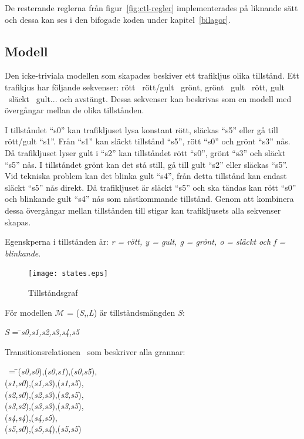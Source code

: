 De resterande reglerna från figur~\ref{fig:ctl-regler} implementerades på liknande sätt och dessa kan ses i den bifogade koden under kapitel~\ref{bilagor}.

\subsection{Modell}\label{sub:modell}

Den icke-triviala modellen som skapades beskiver ett trafikljus olika tillstånd. Ett trafikjus har följande sekvenser: rött \textrightarrow\ rött/gult \textrightarrow\ grönt, grönt \textrightarrow\ gult \textrightarrow\ rött, gult \textrightarrow\ släckt  \textrightarrow\ gult... och avstängt. Dessa sekvenser kan beskrivas som en modell med övergångar mellan de olika tillstånden.

I tillståndet “s0” kan trafikljuset lysa konstant rött, släckas “s5” eller gå till rött/gult “s1”. Från “s1” kan släckt tillstånd “s5”, rött “s0” och grönt “s3” nås. Då trafikljuset lyser gult i “s2” kan tillståndet rött “s0”, grönt “s3” och släckt “s5” nås. I tillståndet grönt kan det stå still, gå till gult “s2” eller släckas “s5”. Vid tekniska problem kan det blinka gult “s4”, från detta tillstånd kan endast släckt “s5” nås direkt. Då trafikljuset är släckt “s5” och ska tändas kan rött “s0” och blinkande gult “s4” nås som nästkommande tillstånd. Genom att kombinera dessa övergångar mellan tillstånden till stigar kan trafikljusets alla sekvenser skapas.

Egenskperna i tillstånden är: \textit{r = rött, y = gult, g = grönt, o = släckt och f = blinkande}.

\begin{figure}[hb]
\texttt{[image: states.eps]}
\caption{Tillståndsgraf}
\label{fig:ctl-states}
\end{figure}

För modellen $\mathcal{M}$ = (\textit{S},\textrightarrow,\textit{L}) är tillståndsmängden \textit{S}:

\begin{tabbing}
\textit{S} = \= \textbraceleft \textit{s0,s1,s2,s3,s4,s5}\textbraceright\\
\end{tabbing}

Transitionsrelationen \textrightarrow\ som beskriver alla grannar: 
\begin{tabbing}
\textrightarrow\ = \= \textbraceleft (\textit{s0,s0}),(\textit{s0,s1}),(\textit{s0,s5}),\\
\> (\textit{s1,s0}),(\textit{s1,s3}),(\textit{s1,s5}),\\
\> (\textit{s2,s0}),(\textit{s2,s3}),(\textit{s2,s5}),\\
\> (\textit{s3,s2}),(\textit{s3,s3}),(\textit{s3,s5}),\\
\> (\textit{s4,s4}),(\textit{s4,s5}),\\
\> (\textit{s5,s0}),(\textit{s5,s4}),(\textit{s5,s5})\textbraceright\\
\end{tabbing}

